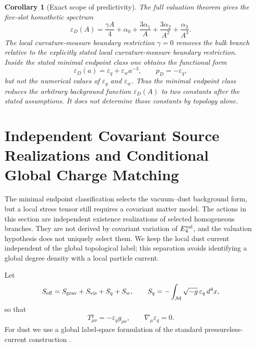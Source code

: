 \documentclass[11pt,a4paper]{article}
\def\dd{d}%
\numberwithin{equation}{section}
\theoremstyle{definition}
\theoremstyle{plain}
\newtheorem{corollary}[criterion]{Corollary}
\theoremstyle{remark}
\newcommand{\M}{\mathcal{M}}
\newcommand{\Efour}{E_4}
\newcommand{\epsD}{\varepsilon_D}
\newcommand{\pD}{p_D}
\newcommand{\dd}{\mathrm{d}}
\begin{document}
\begin{corollary}[Exact scope of predictivity]
The full valuation theorem gives the five-slot homothetic spectrum
\begin{equation}
\epsD(A)=\frac{\gamma A}{4}+\alpha_0+\frac{3\alpha_1}{A}+\frac{3\alpha_2}{A^2}+\frac{\alpha_3}{A^3}.
\end{equation}
The local curvature-measure boundary restriction \(\gamma=0\) removes the bulk branch relative to the explicitly stated local curvature-measure boundary restriction. Inside the stated minimal endpoint class one obtains the functional form
\begin{equation}
\epsD(a)=\varepsilon_q+\varepsilon_w a^{-3},
\qquad
\pD=-\varepsilon_q,
\end{equation}
but not the numerical values of \(\varepsilon_q\) and \(\varepsilon_w\). Thus the minimal endpoint class reduces the arbitrary background function \(\epsD(A)\) to two constants after the stated assumptions. It does not determine those constants by topology alone.
\end{corollary}

\section{Independent Covariant Source Realizations and Conditional Global Charge Matching}
The minimal endpoint classification selects the vacuum--dust background form, but a local stress tensor still requires a covariant matter model. The actions in this section are independent existence realizations of selected homogeneous branches. They are not derived by covariant variation of \(\Efour^{\rm val}\), and the valuation hypothesis does not uniquely select them. We keep the local dust current independent of the global topological label; this separation avoids identifying a global degree density with a local particle current.

Let
\begin{equation}
S_{\rm eff}=S_{\rm grav}+S_{\rm vis}+S_q+S_w,
\qquad
S_q=-\int_{\M}\sqrt{-g}\,\varepsilon_q\,\dd^4x,
\end{equation}
so that
\begin{equation}
T^q_{\mu\nu}=-\varepsilon_q g_{\mu\nu},
\qquad
\nabla_\mu\varepsilon_q=0.
\end{equation}
For dust we use a global label-space formulation of the standard pressureless-current construction \cite{Brown1993Fluid,BrownKuchar1995}.
\end{document}

